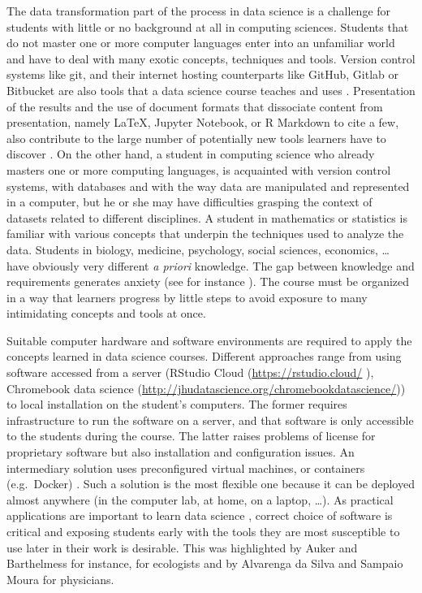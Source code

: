 \documentclass{aims}
\theoremstyle{definition}
\begin{document}
The data transformation part of the process in data science is a
challenge for students with little or no background at all in computing
sciences. Students that do not master one or more computer languages
enter into an unfamiliar world and have to deal with many exotic
concepts, techniques and tools. Version control systems like git, and
their internet hosting counterparts like GitHub, Gitlab or Bitbucket are
also tools that a data science course teaches and uses
\cite{Fiksel2019, Hsing2019}. Presentation of the results and the use of
document formats that dissociate content from presentation, namely
LaTeX, Jupyter Notebook, or R Markdown to cite a few, also contribute to
the large number of potentially new tools learners have to discover
\cite{Baumer2014}. On the other hand, a student in computing science who
already masters one or more computing languages, is acquainted with
version control systems, with databases and with the way data are
manipulated and represented in a computer, but he or she may have
difficulties grasping the context of datasets related to different
disciplines. A student in mathematics or statistics is familiar with
various concepts that underpin the techniques used to analyze the data.
Students in biology, medicine, psychology, social sciences, economics,
\ldots{} have obviously very different \emph{a priori} knowledge. The
gap between knowledge and requirements generates anxiety (see for
instance \cite{Onwuegbuzie2003}). The course must be organized in a way
that learners progress by little steps to avoid exposure to many
intimidating concepts and tools at once.

Suitable computer hardware and software environments are required to
apply the concepts learned in data science courses. Different approaches
range from using software accessed from a server \cite{Theobold2021}
(RStudio Cloud (\url{https://rstudio.cloud/} \cite{Rstudio2015}),
Chromebook data science
(\url{http://jhudatascience.org/chromebookdatascience/})) to local
installation on the student's computers. The former requires
infrastructure to run the software on a server, and that software is
only accessible to the students during the course. The latter raises
problems of license for proprietary software but also installation and
configuration issues. An intermediary solution uses preconfigured
virtual machines, or containers (e.g.~Docker)
\cite{Cetinkaya-Rundel2018, Boettiger2015}. Such a solution is the most
flexible one because it can be deployed almost anywhere (in the computer
lab, at home, on a laptop, \ldots). As practical applications are
important to learn data science \cite{Larwin2011}, correct choice of
software is critical and exposing students early with the tools they are
most susceptible to use later in their work is desirable. This was
highlighted by Auker and Barthelmess \cite{Auker2020} for instance, for
ecologists and by Alvarenga da Silva and Sampaio Moura
\cite{Alvarenga2020} for physicians.
\end{document}

